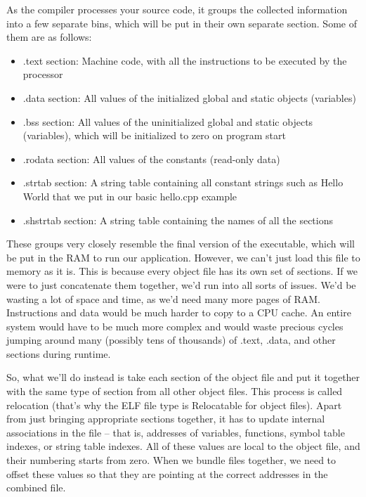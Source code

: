As the compiler processes your source code, it groups the collected information into a few separate bins, which will be put in their own separate section. Some of them are as follows:

\begin{itemize}
\item 
.text section: Machine code, with all the instructions to be executed by the processor

\item 
.data section: All values of the initialized global and static objects (variables)

\item 
.bss section: All values of the uninitialized global and static objects (variables), which will be initialized to zero on program start

\item 
.rodata section: All values of the constants (read-only data)

\item 
.strtab section: A string table containing all constant strings such as Hello World that we put in our basic hello.cpp example

\item 
.shstrtab section: A string table containing the names of all the sections
\end{itemize}

These groups very closely resemble the final version of the executable, which will be put in the RAM to run our application. However, we can't just load this file to memory as it is. This is because every object file has its own set of sections. If we were to just concatenate them together, we'd run into all sorts of issues. We'd be wasting a lot of space and time, as we'd need many more pages of RAM. Instructions and data would be much harder to copy to a CPU cache. An entire system would have to be much more complex and would waste precious cycles jumping around many (possibly tens of thousands) of .text, .data, and other sections during runtime.

So, what we'll do instead is take each section of the object file and put it together with the same type of section from all other object files. This process is called relocation (that's why the ELF file type is Relocatable for object files). Apart from just bringing appropriate sections together, it has to update internal associations in the file – that is, addresses of variables, functions, symbol table indexes, or string table indexes. All of these values are local to the object file, and their numbering starts from zero. When we bundle files together, we need to offset these values so that they are pointing at the correct addresses in the combined file.

